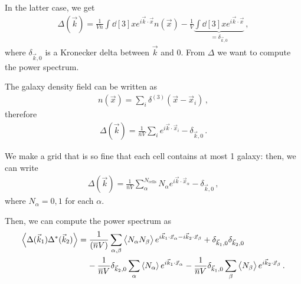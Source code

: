 \documentclass[main.tex]{subfiles}
\begin{document}
In the latter case, we get 
%
\begin{align}
\Delta (\vec{k}) = \frac{1}{V \overline{n}} \int \dd[3]{x} e^{i \vec{k} \cdot \vec{x}} n(\vec{x}) - \frac{1}{V} \underbrace{\int \dd[3]{x} e^{i \vec{k} \cdot \vec{x}}}_{ =\delta_{\vec{k}, 0} } 
\,,
\end{align}
%
where \(\delta_{\vec{k}, 0}\) is a Kronecker delta between \(\vec{k}\) and \(0\). 
From \(\Delta \) we want to compute the power spectrum. 

The galaxy density field can be written as 
%
\begin{align}
n(\vec{x}) = \sum _i \delta^{(3)} (\vec{x} - \vec{x}_i)
\,,
\end{align}
%
therefore 
%
\begin{align}
\Delta (\vec{k}) = \frac{1}{\overline{n} V} \sum _{i} e^{i \vec{k} \cdot \vec{x}_i} - \delta_{\vec{k}, 0}
\,.
\end{align}

We make a grid that is so fine that each cell contains at most 1 galaxy: then, we can write 
%
\begin{align}
\Delta (\vec{k}) = \frac{1}{\overline{n} V} \sum _{\alpha }^{N _{\text{cells}}} N_\alpha  e^{i \vec{k} \cdot \vec{x}_\alpha } - \delta_{\vec{k}, 0}
\,,
\end{align}
%
where \(N_\alpha = 0, 1\) for each \(\alpha \). 

Then, we can compute the power spectrum as 
%
\begin{align}
\begin{split}
\expval{\Delta (\vec{k}_1) \Delta^{*} (\vec{k}_2)} &= \frac{1}{(\overline{n} V)} \sum _{\alpha , \beta } \expval{N_\alpha N_\beta } e^{i \vec{k}_1 \cdot \vec{x}_\alpha  - i \vec{k}_2 \cdot \vec{x}_\beta } + \delta_{\vec{k}_1, 0} \delta_{\vec{k}_2, 0 } \\
&\phantom{=}\ 
- \frac{1}{\overline{n} V} \delta_{\vec{k}_2, 0} \sum _{\alpha } \expval{N_\alpha } e^{i \vec{k}_1 \cdot \vec{x}_\alpha }
- \frac{1}{\overline{n} V} \delta_{\vec{k}_1, 0} \sum _{\beta } \expval{N_\beta } e^{i \vec{k}_2 \cdot \vec{x}_\beta  }
\,.
\end{split}
\end{align}
\end{document}
